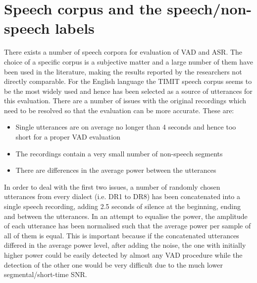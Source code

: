 
\section{Speech corpus and the speech/non-speech labels}

There exists a number of speech corpora for evaluation of VAD and ASR. The choice of a specific corpus is a subjective matter and a large number of them have been used in the literature, making the results reported by the researchers not directly comparable. For the English language the TIMIT speech corpus \cite{TIMIT} seems to be the most widely used and hence has been selected as a source of utterances for this evaluation. There are a number of issues with the original recordings which need to be resolved so that the evaluation can be more accurate. These are:

\begin{itemize}
\item Single utterances are on average no longer than 4 seconds and hence too short for a proper VAD evaluation
\item The recordings contain a very small number of non-speech segments
\item There are differences in the average power between the utterances
\end{itemize}

In order to deal with the first two issues, a number of randomly chosen utterances from every dialect (i.e. DR1 to DR8) has been concatenated into a single speech recording, adding 2.5 seconds of silence at the beginning, ending and between the utterances. In an attempt to equalise the power, the amplitude of each utterance has been normalised such that the average power per sample of all of them is equal. This is important because if the concatenated utterances differed in the average power level, after adding the noise, the one with initially higher power could be easily detected by almost any VAD procedure while the detection of the other one would be very difficult due to the much lower segmental/short-time SNR.

